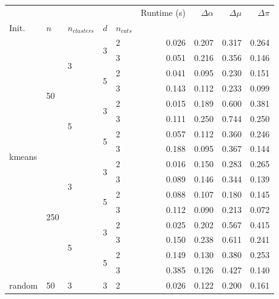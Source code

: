 \begin{table}[H]
\begin{minipage}{.48\columnwidth}
\label{tab:results_god}
\end{minipage} \hspace{.02\columnwidth}%
\begin{minipage}{.48\columnwidth}
\begin{adjustbox}{width=\columnwidth}
\begin{tabular}{lllllrrrr}
\toprule
 &  &  &  &  & Runtime (s) & $\Delta \alpha$ & $\Delta \mu$ & $\Delta \pi$ \\
Init. & $n$ & $n_{clusters}$ & $d$ & $n_{cats}$ &  &  &  &  \\
\midrule
\multirow[t]{16}{*}{kmeans} & \multirow[t]{8}{*}{50} & \multirow[t]{4}{*}{3} & \multirow[t]{2}{*}{3} & 2 & 0.026 & 0.207 & 0.317 & 0.264 \\
 &  &  &  & 3 & 0.051 & 0.216 & 0.356 & 0.146 \\
\cline{4-9}
 &  &  & \multirow[t]{2}{*}{5} & 2 & 0.041 & 0.095 & 0.230 & 0.151 \\
 &  &  &  & 3 & 0.143 & 0.112 & 0.233 & 0.099 \\
\cline{3-9} \cline{4-9}
 &  & \multirow[t]{4}{*}{5} & \multirow[t]{2}{*}{3} & 2 & 0.015 & 0.189 & 0.600 & 0.381 \\
 &  &  &  & 3 & 0.111 & 0.250 & 0.744 & 0.250 \\
\cline{4-9}
 &  &  & \multirow[t]{2}{*}{5} & 2 & 0.057 & 0.112 & 0.360 & 0.246 \\
 &  &  &  & 3 & 0.188 & 0.095 & 0.367 & 0.144 \\
\cline{2-9} \cline{3-9} \cline{4-9}
 & \multirow[t]{8}{*}{250} & \multirow[t]{4}{*}{3} & \multirow[t]{2}{*}{3} & 2 & 0.016 & 0.150 & 0.283 & 0.265 \\
 &  &  &  & 3 & 0.089 & 0.146 & 0.344 & 0.139 \\
\cline{4-9}
 &  &  & \multirow[t]{2}{*}{5} & 2 & 0.088 & 0.107 & 0.180 & 0.145 \\
 &  &  &  & 3 & 0.112 & 0.090 & 0.213 & 0.072 \\
\cline{3-9} \cline{4-9}
 &  & \multirow[t]{4}{*}{5} & \multirow[t]{2}{*}{3} & 2 & 0.025 & 0.202 & 0.567 & 0.415 \\
 &  &  &  & 3 & 0.150 & 0.238 & 0.611 & 0.241 \\
\cline{4-9}
 &  &  & \multirow[t]{2}{*}{5} & 2 & 0.149 & 0.130 & 0.380 & 0.253 \\
 &  &  &  & 3 & 0.385 & 0.126 & 0.427 & 0.140 \\
\cline{1-9} \cline{2-9} \cline{3-9} \cline{4-9}
\multirow[t]{16}{*}{random} & \multirow[t]{8}{*}{50} & \multirow[t]{4}{*}{3} & \multirow[t]{2}{*}{3} & 2 & 0.026 & 0.122 & 0.200 & 0.161 \\

\end{tabular}
\end{adjustbox}
\end{minipage}
\end{table}
